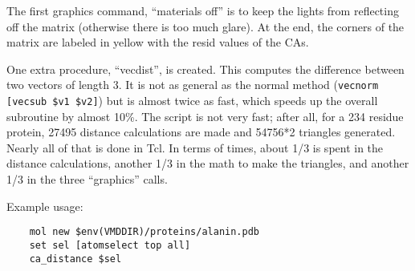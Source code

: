 	The first graphics command, ``materials off'' is to keep the
lights from reflecting off the matrix (otherwise there is too much
glare).  At the end, the corners of the matrix are labeled in yellow
with the resid values of the CAs.

	One extra procedure, ``vecdist'', is created.  This computes
the difference between two vectors of length 3.  It is not as general
as the normal method ({\tt vecnorm [vecsub \$v1 \$v2]}) but is almost
twice as fast, which speeds up the overall subroutine by almost 10\%.
The script is not very fast; after all, for a 234 residue protein,
27495 distance calculations are made and 54756*2 triangles generated.
Nearly all of that is done in Tcl.  In terms of times, about 1/3 is
spent in the distance calculations, another 1/3 in the math to make
the triangles, and another 1/3 in the three ``graphics'' calls.

	Example usage:
\begin{verbatim}
	mol new $env(VMDDIR)/proteins/alanin.pdb
	set sel [atomselect top all]
	ca_distance $sel
\end{verbatim}

